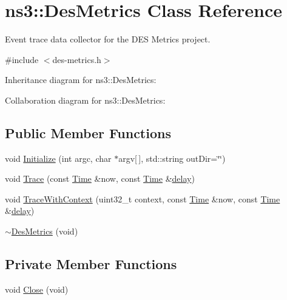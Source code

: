 \hypertarget{classns3_1_1DesMetrics}{}\section{ns3\+:\+:Des\+Metrics Class Reference}
\label{classns3_1_1DesMetrics}


Event trace data collector for the D\+ES Metrics project.  




{\ttfamily \#include $<$des-\/metrics.\+h$>$}



Inheritance diagram for ns3\+:\+:Des\+Metrics\+:


Collaboration diagram for ns3\+:\+:Des\+Metrics\+:
\subsection*{Public Member Functions}
\begin{DoxyCompactItemize}
\item 
void \hyperlink{classns3_1_1DesMetrics_a63bf3891d9fd2cf8c76b375b3db67756}{Initialize} (int argc, char $\ast$argv\mbox{[}$\,$\mbox{]}, std\+::string out\+Dir=\char`\"{}\char`\"{})
\item 
void \hyperlink{classns3_1_1DesMetrics_ab7c6c097412d0398affbc9f8d2643160}{Trace} (const \hyperlink{classns3_1_1Time}{Time} \&now, const \hyperlink{classns3_1_1Time}{Time} \&\hyperlink{mmwave_2model_2fading-traces_2fading__trace__generator_8m_a7964e6aa8f61a9d28973c8267a606ad8}{delay})
\item 
void \hyperlink{classns3_1_1DesMetrics_abc404d9eee92f4e8fd67f5d200490ed6}{Trace\+With\+Context} (uint32\+\_\+t context, const \hyperlink{classns3_1_1Time}{Time} \&now, const \hyperlink{classns3_1_1Time}{Time} \&\hyperlink{mmwave_2model_2fading-traces_2fading__trace__generator_8m_a7964e6aa8f61a9d28973c8267a606ad8}{delay})
\item 
\hyperlink{classns3_1_1DesMetrics_afcb9062eb72bbad4a2b91cf6d8604ac3}{$\sim$\+Des\+Metrics} (void)
\end{DoxyCompactItemize}
\subsection*{Private Member Functions}
\begin{DoxyCompactItemize}
\item 
void \hyperlink{classns3_1_1DesMetrics_a17b52dbb23cd230d64404f57f59029c5}{Close} (void)
\end{DoxyCompactItemize}
